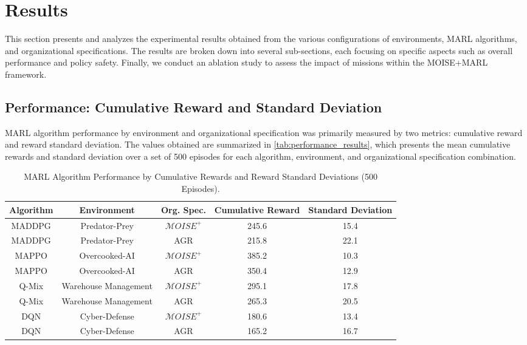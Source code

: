 \documentclass[sigconf,anonymous]{aamas}
\begin{document}
\section{Results}
\label{sec:results}

This section presents and analyzes the experimental results obtained from the various configurations of environments, MARL algorithms, and organizational specifications. The results are broken down into several sub-sections, each focusing on specific aspects such as overall performance and policy safety. Finally, we conduct an ablation study to assess the impact of missions within the MOISE+MARL framework.

\subsection{Performance: Cumulative Reward and Standard Deviation}

MARL algorithm performance by environment and organizational specification was primarily measured by two metrics: cumulative reward and reward standard deviation. The values obtained are summarized in \autoref{tab:performance_results}, which presents the mean cumulative rewards and standard deviation over a set of 500 episodes for each algorithm, environment, and organizational specification combination.

\begin{table*}[h!]
    \centering
    \caption{MARL Algorithm Performance by Cumulative Rewards and Reward Standard Deviations (500 Episodes).}
    \label{tab:performance_results}
    \begin{tabular}{|c|c|c|c|c|}
        \hline
        \textbf{Algorithm} & \textbf{Environment} & \textbf{Org. Spec.} & \textbf{Cumulative Reward} & \textbf{Standard Deviation} \\ \hline
        MADDPG & Predator-Prey & $\mathcal{M}OISE^+$ & 245.6 & 15.4 \\ \hline
        MADDPG & Predator-Prey & AGR & 215.8 & 22.1 \\ \hline
        MAPPO & Overcooked-AI & $\mathcal{M}OISE^+$ & 385.2 & 10.3 \\ \hline
        MAPPO & Overcooked-AI & AGR & 350.4 & 12.9 \\ \hline
        Q-Mix & Warehouse Management & $\mathcal{M}OISE^+$ & 295.1 & 17.8 \\ \hline
        Q-Mix & Warehouse Management & AGR & 265.3 & 20.5 \\ \hline
        DQN & Cyber-Defense & $\mathcal{M}OISE^+$ & 180.6 & 13.4 \\ \hline
        DQN & Cyber-Defense & AGR & 165.2 & 16.7 \\ \hline
    \end{tabular}
\end{table*}
\end{document}
